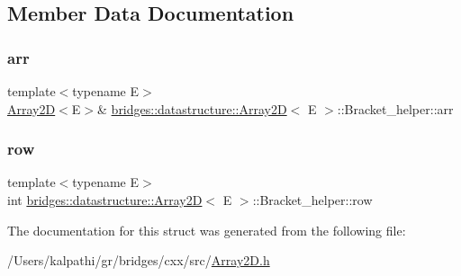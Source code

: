 \subsection{Member Data Documentation}
\mbox{\label{structbridges_1_1datastructure_1_1_array2_d_1_1_bracket__helper_a77fc2a11bc16c90eadfc0369c6f2979b}} 
\subsubsection{\texorpdfstring{arr}{arr}}
{\footnotesize\ttfamily template$<$typename E$>$ \\
\mbox{\hyperlink{classbridges_1_1datastructure_1_1_array2_d}{Array2D}}$<$E$>$\& \mbox{\hyperlink{classbridges_1_1datastructure_1_1_array2_d}{bridges\+::datastructure\+::\+Array2D}}$<$ E $>$\+::Bracket\+\_\+helper\+::arr}

\mbox{\label{structbridges_1_1datastructure_1_1_array2_d_1_1_bracket__helper_a6f09a65776d572d4fdfedb6c3a822e2a}} 
\subsubsection{\texorpdfstring{row}{row}}
{\footnotesize\ttfamily template$<$typename E$>$ \\
int \mbox{\hyperlink{classbridges_1_1datastructure_1_1_array2_d}{bridges\+::datastructure\+::\+Array2D}}$<$ E $>$\+::Bracket\+\_\+helper\+::row}



The documentation for this struct was generated from the following file\+:\begin{DoxyCompactItemize}
\item 
/\+Users/kalpathi/gr/bridges/cxx/src/\mbox{\hyperlink{_array2_d_8h}{Array2\+D.\+h}}\end{DoxyCompactItemize}
